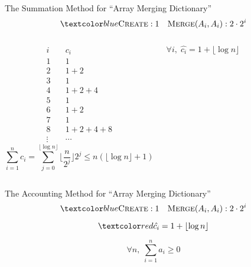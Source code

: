\begin{frame}{}
  \begin{exampleblock}{The Summation Method for ``Array Merging Dictionary''}
    \[
	  \blue{\textsc{Create}: 1 \quad \textsc{Merge$(A_i, A_i)$}: 2 \cdot 2^i}
    \]
  \end{exampleblock}

  \begin{columns}
      \pause
      \begin{align*}
	i & \quad c_i \\
	1 & \quad 1  \\
	2 & \quad 1 + 2 \\
	3 & \quad 1 \\
	4 & \quad 1 + 2 + 4 \\
	5 & \quad 1 \\
	6 & \quad 1 + 2 \\
	7 & \quad 1 \\
	8 & \quad 1 + 2 + 4 + 8 \\
	\vdots & \quad \cdots
      \end{align*}
      \pause
      \[
	\sum_{i=1}^{n} c_i = \sum_{j=0}^{\lfloor \log n \rfloor} \lfloor \frac{n}{2^j} \rfloor 2^j \le n (\lfloor \log n \rfloor + 1)
      \]

      \pause
      \[
	\forall i,\; \hat{c_i} = 1 + \lfloor \log n \rfloor
      \]
  \end{columns}
\end{frame}

\begin{frame}{}
  \begin{exampleblock}{The Accounting Method for ``Array Merging Dictionary''}
    \[
	  \blue{\textsc{Create}: 1 \quad \textsc{Merge$(A_i, A_i)$}: 2 \cdot 2^i}
    \]
  \end{exampleblock}

  \pause
  \[
	\red{\hat{c_i} = 1 + \lfloor \log n \rfloor}
  \]

  \pause

  \pause
  \[
    \forall n,\; \sum_{i=1}^{n} a_i \geq 0
  \]
\end{frame}
